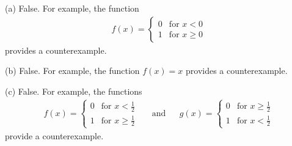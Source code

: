 \begin{answer}
(a) False. For example, the function
\begin{align*}
f(x) = \begin{cases}
               0 & \text{for $x<0$} \\
               1 & \text{for $x\ge0$}
      \end{cases}
\end{align*}
provides a counterexample.

\noindent (b)
False. For example, the function $f(x)=x$ provides a counterexample.

\noindent (c)
False. For example, the functions
\begin{align*}
f(x) = \begin{cases}
               0 & \text{for $x<\frac{1}{2}$} \\
               1 & \text{for $x\ge\frac{1}{2}$}
      \end{cases}
&&\mbox{and}&&g(x) = \begin{cases}
               0 & \text{for $x\ge \frac{1}{2}$} \\
               1 & \text{for $x<\frac{1}{2}$}
      \end{cases}
\end{align*}
provide a counterexample.


\end{answer}

